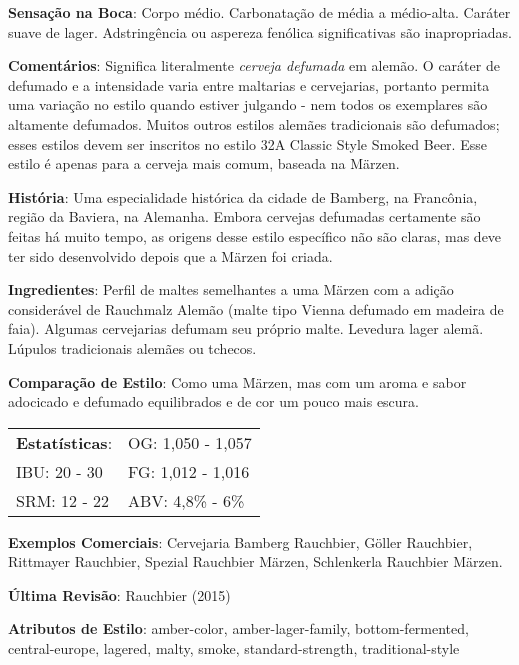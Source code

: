 \textbf{Sensação na Boca}: Corpo médio. Carbonatação de média a médio-alta. Caráter suave de lager. Adstringência ou aspereza fenólica significativas são inapropriadas.

\textbf{Comentários}: Significa literalmente \textit{cerveja defumada} em alemão. O caráter de defumado e a intensidade varia entre maltarias e cervejarias, portanto permita uma variação no estilo quando estiver julgando - nem todos os exemplares são altamente defumados. Muitos outros estilos alemães tradicionais são defumados; esses estilos devem ser inscritos no estilo 32A Classic Style Smoked Beer. Esse estilo é apenas para a cerveja mais comum, baseada na Märzen.

\textbf{História}: Uma especialidade histórica da cidade de Bamberg, na Francônia, região da Baviera, na Alemanha. Embora cervejas defumadas certamente são feitas há muito tempo, as origens desse estilo específico não são claras, mas deve ter sido desenvolvido depois que a Märzen foi criada.

\textbf{Ingredientes}: Perfil de maltes semelhantes a uma Märzen com a adição considerável de Rauchmalz Alemão (malte tipo Vienna defumado em madeira de faia). Algumas cervejarias defumam seu próprio malte. Levedura lager alemã. Lúpulos tradicionais alemães ou tchecos.

\textbf{Comparação de Estilo}: Como uma Märzen, mas com um aroma e sabor adocicado e defumado equilibrados e de cor um pouco mais escura.

\begin{tabular}{@{}p{35mm}p{35mm}@{}}
  \textbf{Estatísticas}: & OG: 1,050 - 1,057 \\
  IBU: 20 - 30  & FG: 1,012 - 1,016  \\
  SRM: 12 - 22  & ABV: 4,8\% - 6\%
\end{tabular}

\textbf{Exemplos Comerciais}: Cervejaria Bamberg Rauchbier, Göller Rauchbier, Rittmayer Rauchbier, Spezial Rauchbier Märzen, Schlenkerla Rauchbier Märzen.

\textbf{Última Revisão}: Rauchbier (2015)

\textbf{Atributos de Estilo}: amber-color, amber-lager-family, bottom-fermented, central-europe, lagered, malty, smoke, standard-strength, traditional-style
